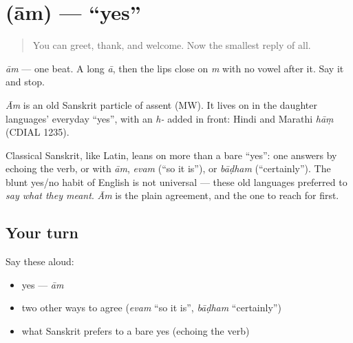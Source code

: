 \section[\texorpdfstring{\sk{आम्} (ām)}{आम् (ām)}]{ (ām) — \textquotedblleft{}yes\textquotedblright{}}

\label{lesson:SA-C01-am}



\begin{quote}
You can greet, thank, and welcome. Now the smallest reply of all.
\end{quote}

\begin{sounds}
\emph{ām} — one beat. A long \emph{ā}, then the lips close on \emph{m} with no vowel after it. Say it and stop.
\end{sounds}

\begin{cousinweb}
\emph{Ām} is an old Sanskrit particle of assent (MW). It lives on in the daughter languages' everyday \textquotedblleft{}yes\textquotedblright{}, with an \emph{h-} added in front: Hindi and Marathi \emph{hāṃ} (CDIAL 1235).
\end{cousinweb}

\begin{culture}
Classical Sanskrit, like Latin, leans on more than a bare \textquotedblleft{}yes\textquotedblright{}: one answers by echoing the verb, or with \emph{ām}, \emph{evam} (\textquotedblleft{}so it is\textquotedblright{}), or \emph{bāḍham} (\textquotedblleft{}certainly\textquotedblright{}). The blunt yes/no habit of English is not universal — these old languages preferred to \emph{say what they meant}. \emph{Ām} is the plain agreement, and the one to reach for first.
\end{culture}

\subsection*{Your turn}
Say these aloud:

\begin{itemize}
\raggedright
  \item yes — \emph{ām}
  \item two other ways to agree (\emph{evam} \textquotedblleft{}so it is\textquotedblright{}, \emph{bāḍham} \textquotedblleft{}certainly\textquotedblright{})
  \item what Sanskrit prefers to a bare yes (echoing the verb)
\end{itemize}

